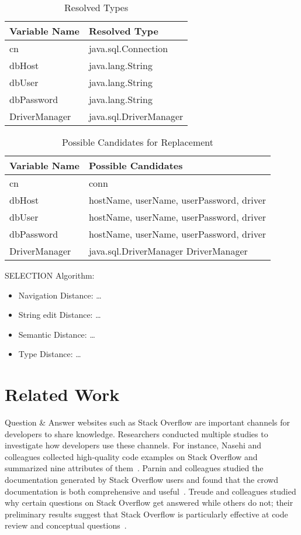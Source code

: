 \begin{table}[!htbp]
\normalsize
    \centering
    \begin{tabular}{|l|l|}
    \hline
    Variable Name & Resolved Type \\ \hline
    cn & java.sql.Connection \\ \hline
    dbHost & java.lang.String \\ \hline
    dbUser & java.lang.String \\ \hline
    dbPassword & java.lang.String \\ \hline
    DriverManager & java.sql.DriverManager \\ \hline
    \end{tabular}
        \caption{Resolved Types}
\end{table}


\begin{table}[!htbp]
\normalsize
    \centering
    \begin{tabular}{|l|l|}
    \hline
    Variable Name & Possible Candidates \\ \hline
    cn & conn \\ \hline
    dbHost & hostName, userName, userPassword, driver \\ \hline
    dbUser & hostName, userName, userPassword, driver \\ \hline
    dbPassword & hostName, userName, userPassword, driver \\ \hline
    DriverManager & java.sql.DriverManager DriverManager  \\ \hline
    \end{tabular}
        \caption{Possible Candidates for Replacement}
\end{table}

SELECTION Algorithm:
\begin{itemize}
\item Navigation Distance: \ldots
\item String edit Distance: \ldots
\item Semantic Distance: \ldots
\item Type Distance: \ldots
\end{itemize}

\section{Related Work}
Question \& Answer websites such as Stack Overflow are important channels for
developers to share knowledge. Researchers conducted multiple studies to
investigate how developers use these channels. For instance, Nasehi and
colleagues collected high-quality code examples on Stack Overflow and summarized
nine attributes of them~\cite{Nasehi}. Parnin and colleagues studied the
documentation generated by Stack Overflow users and found that the crowd
documentation is both comprehensive and useful~\cite{Parnin}. Treude and
colleagues studied why certain questions on Stack Overflow get answered while
others do not; their preliminary results suggest that Stack Overflow is
particularly effective at code review and conceptual questions~\cite{Treude}.


